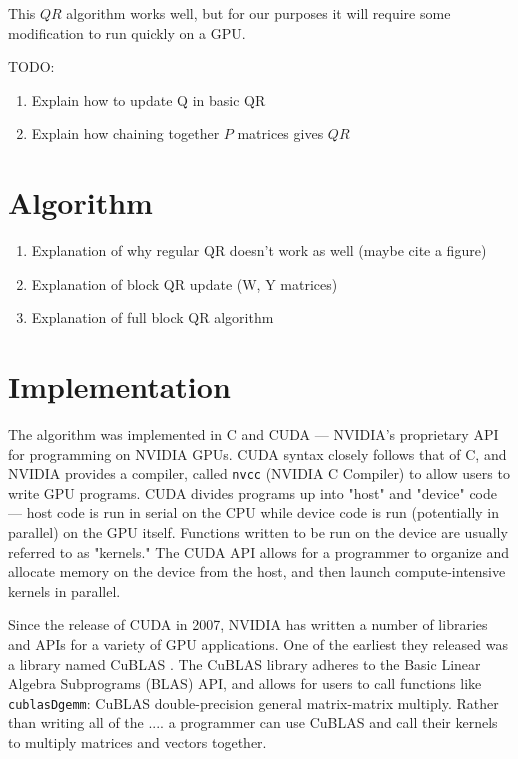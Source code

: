 \documentclass[12pt]{article}
\begin{document}
This $QR$ algorithm works well, but for our purposes it will require some modification
to run quickly on a GPU.
\par\null\par
TODO:
\begin{enumerate}
    \item Explain how to update Q in basic QR
    \item Explain how chaining together $P$ matrices gives $QR$ 
\end{enumerate}

\section*{Algorithm}
\begin{enumerate}
    \item Explanation of why regular QR doesn't work as well (maybe cite a figure)
    \item Explanation of block QR update (W, Y matrices)
    \item Explanation of full block QR algorithm
\end{enumerate}

\section*{Implementation}

The algorithm was implemented in C and CUDA --- NVIDIA's proprietary API for programming
on NVIDIA GPUs. CUDA syntax closely follows that of C, and NVIDIA provides a compiler, 
called \texttt{nvcc} (NVIDIA C Compiler) to allow users to write GPU programs. CUDA 
divides programs up into "host" and "device" code --- host code is run in serial on the 
CPU while device code is run (potentially in parallel) on the GPU itself. Functions 
written to be run on the device are usually referred to as "kernels." The CUDA API allows 
for a programmer to organize and allocate memory on the device from the host, and then 
launch compute-intensive kernels in parallel. 

Since the release of CUDA in 2007, NVIDIA has written a number of libraries and APIs for 
a variety of GPU applications. One of the earliest they released was a library named 
CuBLAS \cite{cublas}. The CuBLAS library adheres to the Basic Linear Algebra Subprograms (BLAS) 
API, and allows for users to call functions like \texttt{cublasDgemm}: CuBLAS 
double-precision general matrix-matrix multiply. Rather than writing all of the .... a 
programmer can use CuBLAS and call their kernels to multiply matrices and vectors together.
\end{document}
